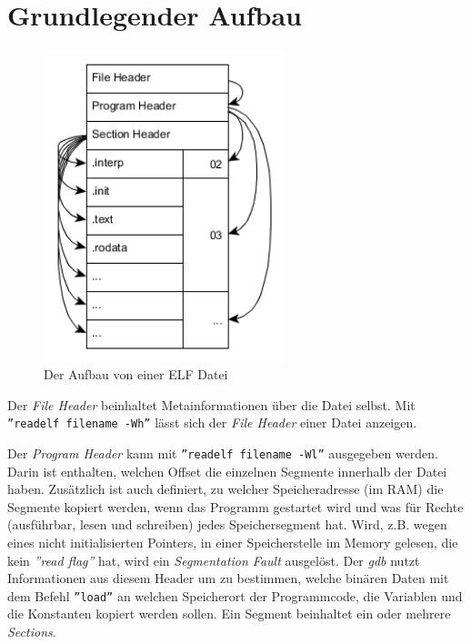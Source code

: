 \section{Grundlegender Aufbau}
\begin{figure}[htbp]
	\centering
		\includegraphics[width=7cm,keepaspectratio]{graphs/elf.png}
	\caption[Der Aufbau von einer ELF Datei]{Der Aufbau von einer ELF Datei\footnotemark}
	\label{fig:ELFStructure}
\end{figure}




Der \textit{File Header} beinhaltet Metainformationen über die Datei selbst.
Mit \texttt{''readelf filename -Wh''} lässt sich der \textit{File Header} einer Datei anzeigen.

Der \textit{Program Header} kann mit \texttt{''readelf filename -Wl''} ausgegeben werden.
Darin ist enthalten, welchen Offset die einzelnen Segmente innerhalb der Datei haben.
Zusätzlich ist auch definiert, zu welcher Speicheradresse (im RAM) die Segmente kopiert werden, wenn das Programm gestartet wird und was für Rechte (ausführbar, lesen und schreiben) jedes Speichersegment hat.
Wird, z.B. wegen eines nicht initialisierten Pointers, in einer Speicherstelle im Memory gelesen, die kein \textit{''read flag''} hat, wird ein \textit{Segmentation Fault} ausgelöst.
Der \textit{gdb} nutzt Informationen aus diesem Header um zu bestimmen, welche binären Daten mit dem Befehl \texttt{''load''} an welchen Speicherort der Programmcode, die Variablen und die Konstanten kopiert werden sollen.
Ein Segment beinhaltet ein oder mehrere \textit{Sections}.

